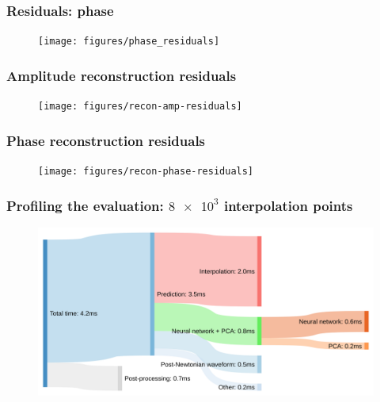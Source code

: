 \documentclass{beamer}
\begin{document}
\begin{frame}
    \frametitle{Residuals: phase}
    \begin{figure}[ht]
    \centering
    \texttt{[image: figures/phase\_residuals]}
    \label{fig:phase_residuals}
    \end{figure}
\end{frame}

\begin{frame}
    \frametitle{Amplitude reconstruction residuals}
    \begin{figure}[ht]
    \centering
    \texttt{[image: figures/recon-amp-residuals]}
    \label{fig:recon-amp-residuals}
    \end{figure}
\end{frame}

\begin{frame}
    \frametitle{Phase reconstruction residuals}
    \begin{figure}[ht]
    \centering
    \texttt{[image: figures/recon-phase-residuals]}
    \label{fig:recon-phase-residuals}
    \end{figure}
\end{frame}

\begin{frame}
    \frametitle{Profiling the evaluation: \(\num{8e3}\) interpolation points}
    \begin{figure}[ht]
    \centering
    \includegraphics[width=\textwidth]{figures/sankey_downsampled}
    \label{fig:sankey_downsampled}
    \end{figure}
\end{frame}
\end{document}
